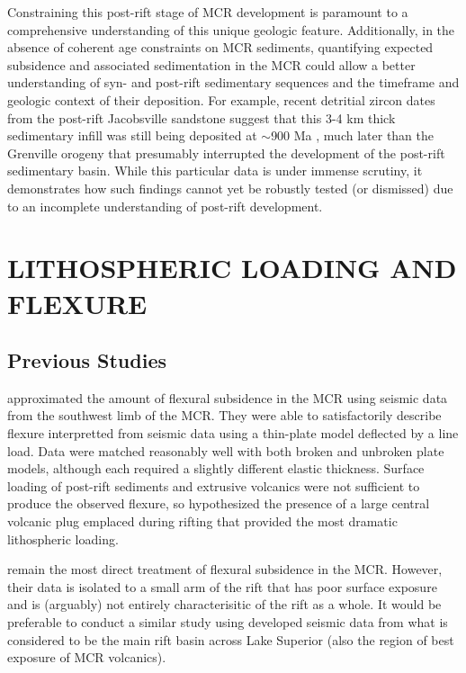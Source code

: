 \documentclass[12pt,letterpaper]{article}
\begin{document}
Constraining this post-rift stage of MCR development is paramount to a comprehensive understanding of this unique geologic feature. Additionally, in the absence of coherent age constraints on MCR sediments, quantifying expected subsidence and associated sedimentation in the MCR could allow a better understanding of syn- and post-rift sedimentary sequences and the timeframe and geologic context of their deposition. For example, recent detritial zircon dates from the post-rift Jacobsville sandstone suggest that this 3-4 km thick sedimentary infill was still being deposited at $\sim$900 Ma \citep{Craddock2013a}, much later than the Grenville orogeny that presumably interrupted the development of the post-rift sedimentary basin. While this particular data is under immense scrutiny, it demonstrates how such findings cannot yet be robustly tested (or dismissed) due to an incomplete understanding of post-rift development.\par


\section*{LITHOSPHERIC LOADING AND FLEXURE}
\subsection*{Previous Studies}
\cite{Nyquist1988a} approximated the amount of flexural subsidence in the MCR using seismic data from the southwest limb of the MCR. They were able to satisfactorily describe flexure interpretted from seismic data using a thin-plate model deflected by a line load. Data were matched reasonably well with both broken and unbroken plate models, although each required a slightly different elastic thickness. Surface loading of post-rift sediments and extrusive volcanics were not sufficient to produce the observed flexure, so \cite{Nyquist1988a} hypothesized the presence of a large central volcanic plug emplaced during rifting that provided the most dramatic lithospheric loading.\par

\cite{Nyquist1988a} remain the most direct treatment of flexural subsidence in the MCR. However, their data is isolated to a small arm of the rift that has poor surface exposure and is (arguably) not entirely characterisitic of the rift as a whole. It would be preferable to conduct a similar study using developed seismic data \citep{Behrendt1990a} from what is considered to be the main rift basin across Lake Superior (also the region of best exposure of MCR volcanics).\par
\end{document}

